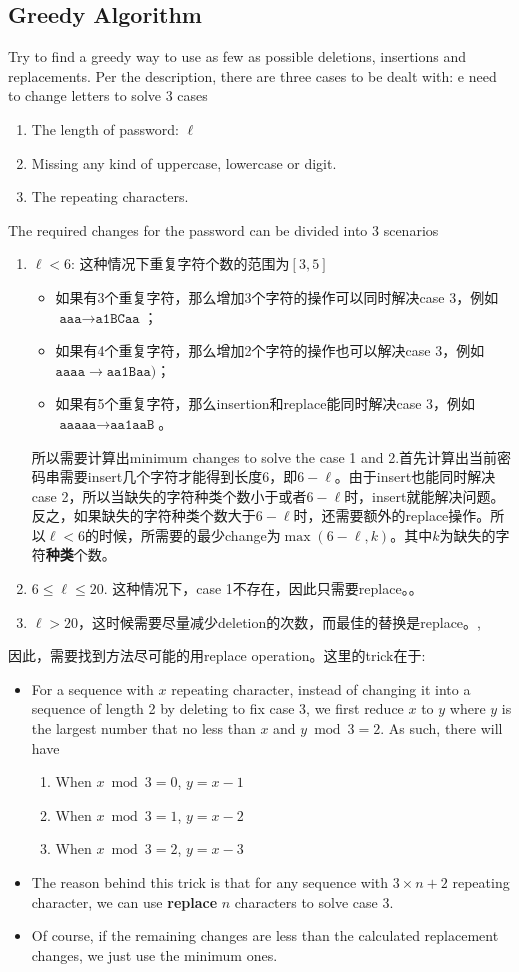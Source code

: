 \subsection{Greedy Algorithm}
Try to find a greedy way to use as few as possible deletions, insertions and replacements. Per the description, there are three cases to be dealt with: e need to change letters to solve 3 cases
\begin{enumerate}
\item The length of password: $\ell$
\item Missing any kind of uppercase, lowercase or digit.
\item The repeating characters.
\end{enumerate}
The required changes for the password can be divided into 3 scenarios
\begin{enumerate}
\item $\ell <  6$: 这种情况下重复字符个数的范围为$[3,5]$
\begin{itemize}
\item 如果有3个重复字符，那么增加3个字符的操作可以同时解决case 3，例如 $\texttt{aaa} \longrightarrow \texttt{a1BCaa}$；
\item 如果有4个重复字符，那么增加2个字符的操作也可以解决case 3，例如$\texttt{aaaa} \longrightarrow \texttt{aa1Baa})$；
\item 如果有5个重复字符，那么insertion和replace能同时解决case 3，例如 $\texttt{aaaaa}\longrightarrow \texttt{aa1aaB}$。
\end{itemize}
所以需要计算出minimum changes to solve the case 1 and 2.首先计算出当前密码串需要insert几个字符才能得到长度6，即$6-\ell$。由于insert也能同时解决case 2，所以当缺失的字符种类个数小于或者$6-\ell$时，insert就能解决问题。反之，如果缺失的字符种类个数大于$6-\ell$时，还需要额外的replace操作。所以$\ell < 6$的时候，所需要的最少change为$\max(6-\ell, k)$。其中$k$为缺失的字符\textbf{种类}个数。
\item $6\leq \ell \leq 20$. 这种情况下，case 1不存在，因此只需要replace。。
\item $\ell > 20$，这时候需要尽量减少deletion的次数，而最佳的替换是replace。,
\end{enumerate}
因此，需要找到方法尽可能的用replace operation。这里的trick在于: 
\begin{itemize}
\item For a sequence with $x$ repeating character, instead of changing it into a sequence of length 2 by deleting to fix case 3, we first reduce $x$ to $y$ where $y$ is the largest number that no less than $x$ and $y\bmod 3=2$. As such, there will have
\begin{enumerate}
\item When $x\bmod 3=0$, $y=x-1$
\item When $x\bmod 3=1$, $y=x-2$
\item When $x\bmod 3=2$, $y=x-3$
\end{enumerate}
\item  The reason behind this trick is that for any sequence with $3\times n+2$ repeating character, we can use \textbf{replace} $n$ characters to solve case 3.
\item Of course, if the remaining changes are less than the calculated replacement changes, we just use the minimum ones.
\end{itemize}
